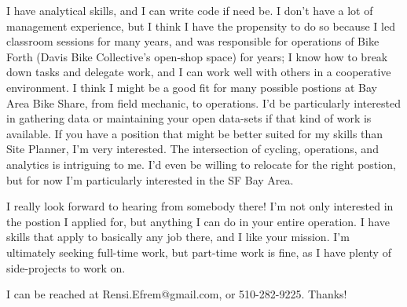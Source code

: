 \documentclass{article}
\begin{document}
I have analytical skills, and I can write code if need be.  I don't have a lot of management experience, but I think I have the propensity to do so because I led classroom sessions for many years, and was responsible for operations of Bike Forth (Davis Bike Collective's open-shop space) for years; I know how to break down tasks and delegate work, and I can work well with others in a cooperative environment.    I think I might be a good fit for many possible postions at Bay Area Bike Share, from field mechanic, to operations.  I'd be particularly interested in gathering data or maintaining your open data-sets if that kind of work is available. If you have a position that might be better suited for my skills than Site Planner, I'm very interested.  The intersection of cycling, operations, and analytics is intriguing to me.  I'd even be willing to relocate for the right postion, but for now I'm particularly interested in the SF Bay Area.

I really look forward to hearing from somebody there! I'm not only interested in the postion I applied for, but anything I can do in your entire operation.  I have skills that apply to basically any job there, and I like your mission. I'm ultimately seeking full-time work, but part-time work is fine, as I have plenty of side-projects to work on.  

I can be reached at Rensi.Efrem@gmail.com, or 510-282-9225.   Thanks!
\end{document}
